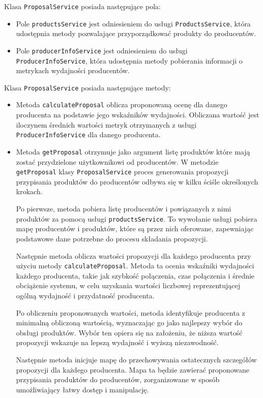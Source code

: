 Klasa \verb|ProposalService| posiada następujące pola:
\begin{itemize}
    \item Pole \verb|productsService| jest odniesieniem do usługi \verb|ProductsService|, która udostępnia metody pozwalające przyporządkować produkty do producentów.
    \item Pole \verb|producerInfoService| jest odniesieniem do usługi \verb|ProducerInfoService|, która udostępnia metody pobierania informacji o metrykach wydajności producentów.
\end{itemize}

Klasa \verb|ProposalService| posiada następujące metody:
\begin{itemize}
    \item Metoda \verb|calculateProposal| oblicza proponowaną ocenę dla danego producenta na podstawie jego wskaźników wydajności. Obliczana wartość jest iloczynem średnich wartości metryk otrzymanych z usługi \verb|ProducerInfoService| dla danego producenta.
    \item Metoda \verb|getProposal| otrzymuje jako argument listę produktów które mają zostać przydzielone użytkownikowi od producentów. W metodzie \verb|getProposal| klasy \verb|ProposalService| proces generowania propozycji przypisania produktów do producentów odbywa się w kilku ściśle określonych krokach. 

    Po pierwsze, metoda pobiera listę producentów i powiązanych z nimi produktów za pomocą usługi \verb|productsService|. To wywołanie usługi pobiera mapę producentów i produktów, które są przez nich oferowane, zapewniając podstawowe dane potrzebne do procesu składania propozycji.

    Następnie metoda oblicza wartości propozycji dla każdego producenta przy użyciu metody \verb|calculateProposal|. Metoda ta ocenia wskaźniki wydajności każdego producenta, takie jak szybkość połączenia, czas połączenia i średnie obciążenie systemu, w celu uzyskania wartości liczbowej reprezentującej ogólną wydajność i przydatność producenta.

    Po obliczeniu proponowanych wartości, metoda identyfikuje producenta z minimalną obliczoną wartością, wyznaczając go jako najlepszy wybór do obsługi produktów. Wybór ten opiera się na założeniu, że niższa wartość propozycji wskazuje na lepszą wydajność i wyższą niezawodność.

    Następnie metoda inicjuje mapę do przechowywania ostatecznych szczegółów propozycji dla każdego producenta. Mapa ta będzie zawierać proponowane przypisania produktów do producentów, zorganizowane w sposób umożliwiający łatwy dostęp i manipulację.


\end{itemize}
